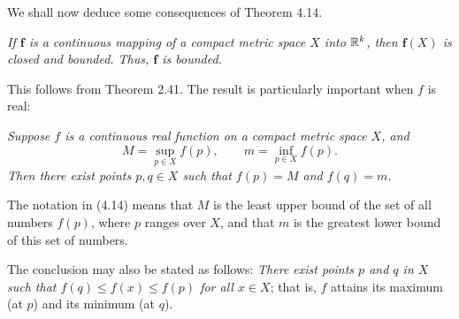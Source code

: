 \begin{center}
\end{center}

We shall now deduce some consequences of Theorem 4.14.

\emph{If $\mathbf{f}$ is a continuous mapping of a compact metric space $X$
into $\mathbb{R}^k$, then $\mathbf{f}(X)$ is closed and bounded. Thus, $\mathbf{f}$
is bounded.}

This follows from Theorem 2.41. The result is particularly important when $f$
is real:

\emph{Suppose $f$ is a continuous real function on a compact metric space
$X$, and}
\begin{equation}
  M = \sup_{p\in X} f(p), \qquad m = \inf_{p\in X} f(p). \tag{4.14}
\end{equation}
\emph{Then there exist points $p, q \in X$ such that $f(p) = M$ and
$f(q) = m$.}

The notation in (4.14) means that $M$ is the least upper bound of the set of
all numbers $f(p)$, where $p$ ranges over $X$, and that $m$ is the greatest
lower bound of this set of numbers.

The conclusion may also be stated as follows: \emph{There exist points $p$
and $q$ in $X$ such that $f(q) \le f(x) \le f(p)$ for all $x \in X$}; that
is, $f$ attains its maximum (at $p$) and its minimum (at $q$).

